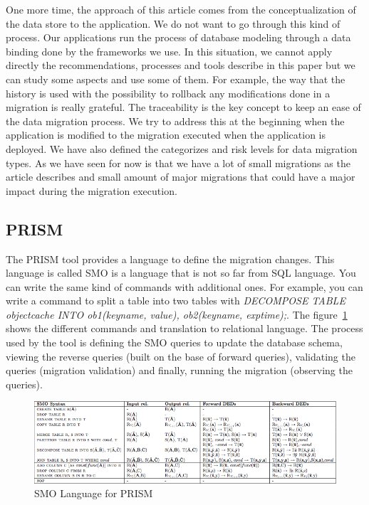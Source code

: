 One more time, the approach of this article comes from the conceptualization of the data store to the application. We do not want to go through this kind of process. Our applications run the process of database modeling through a data binding done by the frameworks we use. In this situation, we cannot apply directly the recommendations, processes and tools describe in this paper but we can study some aspects and use some of them. For example, the way that the history is used with the possibility to rollback any modifications done in a migration is really grateful. The traceability is the key concept to keep an ease of the data migration process. We try to address this at the beginning when the application is modified to the migration executed when the application is deployed. We have also defined the categorizes and risk levels for data migration types. As we have seen for now is that we have a lot of small migrations as the article describes and small amount of major migrations that could have a major impact during the migration execution.

\subsection{PRISM}

The PRISM \cite{curino_prism_2011} tool provides a language to define the migration changes. This language is called SMO\cite{smo} is a language that is not so far from SQL language. You can write the same kind of commands with additional ones. For example, you can write a command to split a table into two tables with \textit{DECOMPOSE TABLE objectcache INTO ob1(keyname, value), ob2(keyname, exptime);}. The figure~\ref{smoLanguage} shows the different commands and translation to relational language. The process used by the tool is defining the SMO queries to update the database schema, viewing the reverse queries (built on the base of forward queries), validating the queries (migration validation) and finally, running the migration (observing the queries).

\begin{figure}[h]
        \centering
        \includegraphics[scale=0.53]{images/Smo-to-ded.png}
        \caption{SMO Language for PRISM \cite{curino_prism_2011}}
        \label{smoLanguage}
\end{figure}

